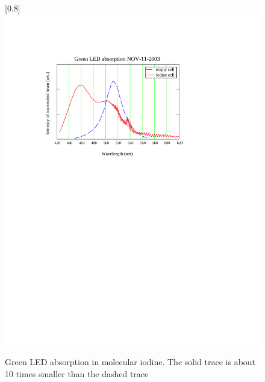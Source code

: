 \begin{figure}
\scalebox{0.8}[0.8]{
\includegraphics[bb=0 450 489 700]
{greenLED/greenLED.pdf}
}
\caption[Green LED absorption in molecular iodine]{Green LED absorption in molecular iodine. The solid trace is about 10 times smaller than the dashed trace}
\label{greenLED}
\end{figure}

